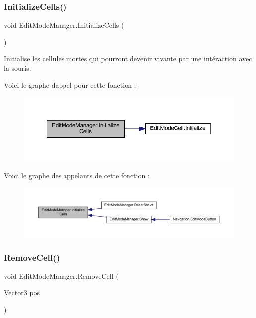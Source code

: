 \subsubsection{\texorpdfstring{Initialize\+Cells()}{InitializeCells()}}
{\footnotesize\ttfamily void Edit\+Mode\+Manager.\+Initialize\+Cells (\begin{DoxyParamCaption}{ }\end{DoxyParamCaption})\hspace{0.3cm}{\ttfamily [inline]}}



Initialise les cellules mortes qui pourront devenir vivante par une intéraction avec la souris. 

Voici le graphe d\textquotesingle{}appel pour cette fonction \+:
\nopagebreak
\begin{figure}[H]
\begin{center}
\leavevmode
\includegraphics[width=350pt]{class_edit_mode_manager_a8a950f58c809a7161d85e5d9a73e4d15_cgraph}
\end{center}
\end{figure}
Voici le graphe des appelants de cette fonction \+:
\nopagebreak
\begin{figure}[H]
\begin{center}
\leavevmode
\includegraphics[width=350pt]{class_edit_mode_manager_a8a950f58c809a7161d85e5d9a73e4d15_icgraph}
\end{center}
\end{figure}
\mbox{\label{class_edit_mode_manager_a8a8c1a3a9558fbbcfa7c15d8ce48a264}} 
\subsubsection{\texorpdfstring{Remove\+Cell()}{RemoveCell()}}
{\footnotesize\ttfamily void Edit\+Mode\+Manager.\+Remove\+Cell (\begin{DoxyParamCaption}\item[{Vector3}]{pos }\end{DoxyParamCaption})\hspace{0.3cm}{\ttfamily [inline]}}



